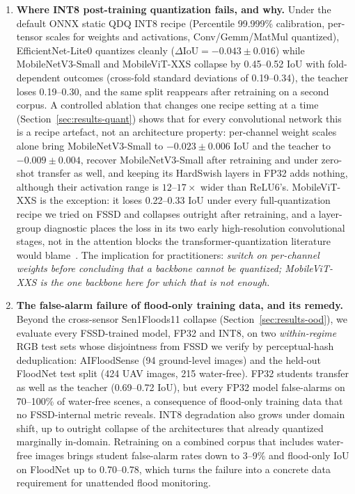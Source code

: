 \begin{enumerate}
\item \textbf{Where INT8 post-training quantization fails, and why.} Under the default ONNX static QDQ INT8 recipe (Percentile 99.999\% calibration, per-tensor scales for weights and activations, Conv/Gemm/MatMul quantized), EfficientNet-Lite0 quantizes cleanly ($\Delta \mathrm{IoU} = -0.043 \pm 0.016$) while MobileNetV3-Small and MobileViT-XXS collapse by 0.45--0.52 IoU with fold-dependent outcomes (cross-fold standard deviations of 0.19--0.34), the teacher loses 0.19--0.30, and the same split reappears after retraining on a second corpus. A controlled ablation that changes one recipe setting at a time (Section~\ref{sec:results-quant}) shows that for every convolutional network this is a recipe artefact, not an architecture property: per-channel weight scales alone bring MobileNetV3-Small to $-0.023 \pm 0.006$ IoU and the teacher to $-0.009 \pm 0.004$, recover MobileNetV3-Small after retraining and under zero-shot transfer as well, and keeping its HardSwish layers in FP32 adds nothing, although their activation range is $12$--$17\times$ wider than ReLU6's. MobileViT-XXS is the exception: it loses 0.22--0.33 IoU under every full-quantization recipe we tried on FSSD and collapses outright after retraining, and a layer-group diagnostic places the loss in its two early high-resolution convolutional stages, not in the attention blocks the transformer-quantization literature would blame~\cite{lin2022fqvit}. The implication for practitioners: \emph{switch on per-channel weights before concluding that a backbone cannot be quantized; MobileViT-XXS is the one backbone here for which that is not enough.}

\item \textbf{The false-alarm failure of flood-only training data, and its remedy.} Beyond the cross-sensor Sen1Floods11 collapse (Section~\ref{sec:results-ood}), we evaluate every FSSD-trained model, FP32 and INT8, on two \emph{within-regime} RGB test sets whose disjointness from FSSD we verify by perceptual-hash deduplication: AIFloodSense (94 ground-level images) and the held-out FloodNet test split (424 UAV images, 215 water-free). FP32 students transfer as well as the teacher (0.69--0.72 IoU), but every FP32 model false-alarms on 70--100\% of water-free scenes, a consequence of flood-only training data that no FSSD-internal metric reveals. INT8 degradation also grows under domain shift, up to outright collapse of the architectures that already quantized marginally in-domain. Retraining on a combined corpus that includes water-free images brings student false-alarm rates down to 3--9\% and flood-only IoU on FloodNet up to 0.70--0.78, which turns the failure into a concrete data requirement for unattended flood monitoring.
\end{enumerate}

